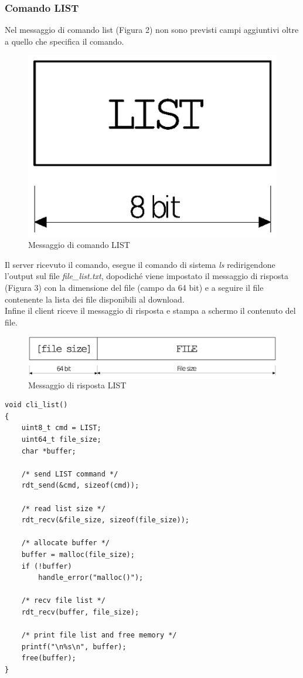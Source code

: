 \subsubsection{Comando LIST}
Nel messaggio di comando list (Figura 2) non sono previsti campi aggiuntivi 
oltre a quello che specifica il comando.
\begin{figure}[!h]
	\includegraphics[scale=0.35]{images/list_client}
	\caption{Messaggio di comando LIST}
\end{figure}
Il server ricevuto il comando, esegue il comando di sistema \emph{ls} 
redirigendone l'output sul file \emph{file\_list.txt}, dopodiché viene 
impostato il messaggio di risposta (Figura 3) con la dimensione del file 
(campo da 64 bit) e a seguire il file contenente la lista dei file 
disponibili al download.\\
Infine il client riceve il messaggio di risposta e stampa a schermo il 
contenuto del file.
\begin{figure}[!h]
	\includegraphics[scale=0.35]{images/list_server}
	\caption{Messaggio di risposta LIST}
\end{figure}
\begin{lstlisting}[title=clicmd.c]
void cli_list()
{
    uint8_t cmd = LIST;
    uint64_t file_size;
    char *buffer;

    /* send LIST command */
    rdt_send(&cmd, sizeof(cmd));

    /* read list size */
    rdt_recv(&file_size, sizeof(file_size));

    /* allocate buffer */
    buffer = malloc(file_size);
    if (!buffer)
        handle_error("malloc()");

    /* recv file list */
    rdt_recv(buffer, file_size);

    /* print file list and free memory */
    printf("\n%s\n", buffer);
    free(buffer);
}                                                                
\end{lstlisting}

